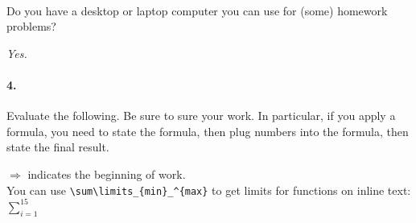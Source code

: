     \paragraph{} Do you have a desktop or laptop computer you can use for (some) homework problems?
    \begin{mdframed}
        \emph{Yes.}
    \end{mdframed}

    \clearpage

    \paragraph{4.} Evaluate the following. Be sure to sure your work. In particular, if you apply a formula, you need to state the formula, then plug numbers into the formula, then state the final result.

    $\Rightarrow$ indicates the beginning of work. 
    \\
    You can use \verb+\sum\limits_{min}_^{max}+ to get limits for functions on inline text: $\sum\limits_{i=1}^{15}$
    
